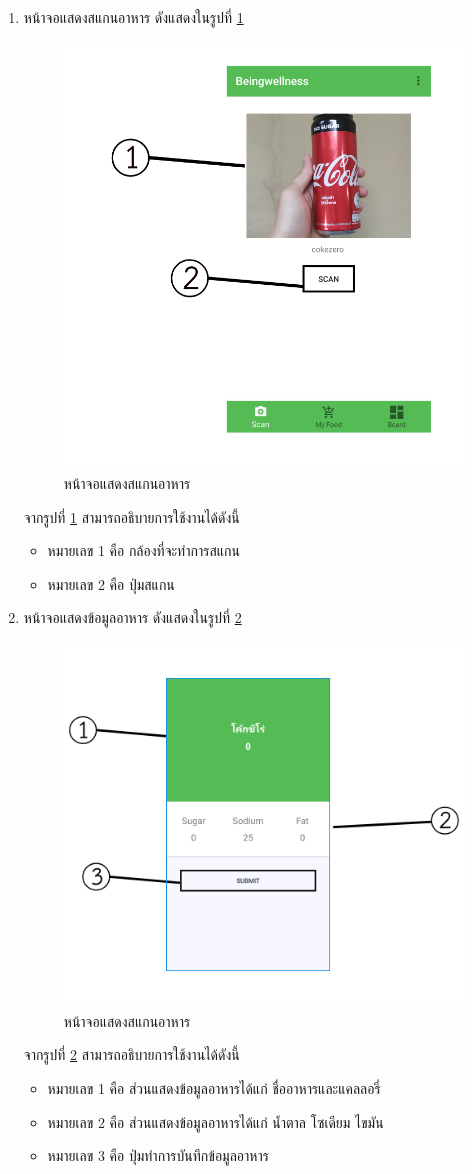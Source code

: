 \begin{enumerate}
					\item  หน้าจอแสดงสแกนอาหาร ดังแสดงในรูปที่ \ref{Fig:scan}
					\begin{figure}[H]
						\centering
						\includegraphics[width=0.5\columnwidth]{Figures/7/teach/7.png}
						\caption{หน้าจอแสดงสแกนอาหาร}
						\label{Fig:scan}
					\end{figure}
				จากรูปที่ \ref{Fig:scan} สามารถอธิบายการใช้งานได้ดังนี้
					\begin{itemize}[label={--}]
						\item หมายเลข 1 คือ กล้องที่จะทำการสแกน
						\item หมายเลข 2 คือ ปุ่มสแกน
						\end{itemize}

						\item  หน้าจอแสดงข้อมูลอาหาร ดังแสดงในรูปที่ \ref{Fig:food}
					\begin{figure}[H]
						\centering
						\includegraphics[width=0.5\columnwidth]{Figures/7/teach/6.png}
						\caption{หน้าจอแสดงสแกนอาหาร}
						\label{Fig:food}
					\end{figure}
				จากรูปที่ \ref{Fig:food} สามารถอธิบายการใช้งานได้ดังนี้
					\begin{itemize}[label={--}]
						\item หมายเลข 1 คือ ส่วนแสดงข้อมูลอาหารได้แก่ ชื่ออาหารและแคลลอรี่
						\item หมายเลข 2 คือ ส่วนแสดงข้อมูลอาหารได้แก่ น้ำตาล โซเดียม ไขมัน
						\item หมายเลข 3 คือ ปุ่มทำการบันทึกข้อมูลอาหาร
						\end{itemize}





\end{enumerate}

